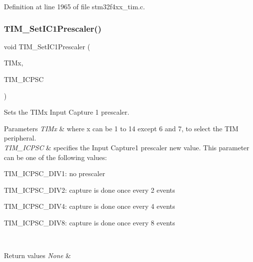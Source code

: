 Definition at line 1965 of file stm32f4xx\+\_\+tim.\+c.

\mbox{\label{group___t_i_m___group3_gaf0f684dea88e222de9689d8ed0ca8805}} 
\subsubsection{\texorpdfstring{T\+I\+M\+\_\+\+Set\+I\+C1\+Prescaler()}{TIM\_SetIC1Prescaler()}}
{\footnotesize\ttfamily void T\+I\+M\+\_\+\+Set\+I\+C1\+Prescaler (\begin{DoxyParamCaption}\item[{\hyperlink{struct_t_i_m___type_def}{T\+I\+M\+\_\+\+Type\+Def} $\ast$}]{T\+I\+Mx,  }\item[{uint16\+\_\+t}]{T\+I\+M\+\_\+\+I\+C\+P\+SC }\end{DoxyParamCaption})}



Sets the T\+I\+Mx Input Capture 1 prescaler. 


\begin{DoxyParams}{Parameters}
{\em T\+I\+Mx} & where x can be 1 to 14 except 6 and 7, to select the T\+IM peripheral. \\
\hline
{\em T\+I\+M\+\_\+\+I\+C\+P\+SC} & specifies the Input Capture1 prescaler new value. This parameter can be one of the following values\+: \begin{DoxyItemize}
\item T\+I\+M\+\_\+\+I\+C\+P\+S\+C\+\_\+\+D\+I\+V1\+: no prescaler \item T\+I\+M\+\_\+\+I\+C\+P\+S\+C\+\_\+\+D\+I\+V2\+: capture is done once every 2 events \item T\+I\+M\+\_\+\+I\+C\+P\+S\+C\+\_\+\+D\+I\+V4\+: capture is done once every 4 events \item T\+I\+M\+\_\+\+I\+C\+P\+S\+C\+\_\+\+D\+I\+V8\+: capture is done once every 8 events \end{DoxyItemize}
\\
\hline
\end{DoxyParams}

\begin{DoxyRetVals}{Return values}
{\em None} & \\
\hline
\end{DoxyRetVals}


